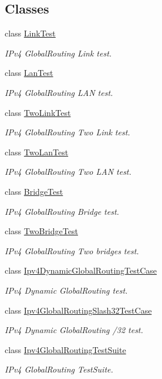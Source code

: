 \subsection*{Classes}
\begin{DoxyCompactItemize}
\item 
class \hyperlink{classLinkTest}{Link\+Test}
\begin{DoxyCompactList}\small\item\em I\+Pv4 Global\+Routing Link test. \end{DoxyCompactList}\item 
class \hyperlink{classLanTest}{Lan\+Test}
\begin{DoxyCompactList}\small\item\em I\+Pv4 Global\+Routing L\+AN test. \end{DoxyCompactList}\item 
class \hyperlink{classTwoLinkTest}{Two\+Link\+Test}
\begin{DoxyCompactList}\small\item\em I\+Pv4 Global\+Routing Two Link test. \end{DoxyCompactList}\item 
class \hyperlink{classTwoLanTest}{Two\+Lan\+Test}
\begin{DoxyCompactList}\small\item\em I\+Pv4 Global\+Routing Two L\+AN test. \end{DoxyCompactList}\item 
class \hyperlink{classBridgeTest}{Bridge\+Test}
\begin{DoxyCompactList}\small\item\em I\+Pv4 Global\+Routing Bridge test. \end{DoxyCompactList}\item 
class \hyperlink{classTwoBridgeTest}{Two\+Bridge\+Test}
\begin{DoxyCompactList}\small\item\em I\+Pv4 Global\+Routing Two bridges test. \end{DoxyCompactList}\item 
class \hyperlink{classIpv4DynamicGlobalRoutingTestCase}{Ipv4\+Dynamic\+Global\+Routing\+Test\+Case}
\begin{DoxyCompactList}\small\item\em I\+Pv4 Dynamic Global\+Routing test. \end{DoxyCompactList}\item 
class \hyperlink{classIpv4GlobalRoutingSlash32TestCase}{Ipv4\+Global\+Routing\+Slash32\+Test\+Case}
\begin{DoxyCompactList}\small\item\em I\+Pv4 Dynamic Global\+Routing /32 test. \end{DoxyCompactList}\item 
class \hyperlink{classIpv4GlobalRoutingTestSuite}{Ipv4\+Global\+Routing\+Test\+Suite}
\begin{DoxyCompactList}\small\item\em I\+Pv4 Global\+Routing Test\+Suite. \end{DoxyCompactList}\end{DoxyCompactItemize}
